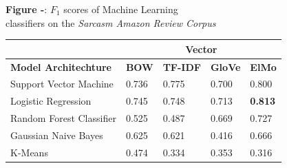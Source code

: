 \documentclass[12pt,a4paper]{article}
\begin{document}
\begin{center}
	\textbf{Figure -}: $F_1$ scores of Machine Learning\\ classifiers on the \textit{Sarcasm Amazon Review Corpus}
\end{center}

\begin{center}
	\begin{tabular}{ |p{4.7cm}||p{1.2cm}|p{1.5cm}|p{1.2cm}|p{1.2cm}|  }
		\hline
		  & \multicolumn{4}{|c|}{\textbf{Vector}} \\
		\hline
		\textbf{Model Architechture}& \textbf{BOW} & \textbf{TF-IDF} & \textbf{GloVe} & \textbf{ElMo}\\
		\hline\hline
		Support Vector Machine   & 0.736    & 0.775 &   0.700 & 0.800\\
		Logistic Regression &   0.745 & 0.748   & 0.713 & \textbf{0.813}\\
		Random Forest Classifier &0.525 & 0.487 &  0.669 & 0.727\\
		Gaussian Naive Bayes  & 0.625  & 0.621&  0.416 &0.666\\
		K-Means& 0.474  & 0.334   & 0.353 & 0.316\\
		\hline
	\end{tabular}
\end{center}

%
\end{document}
